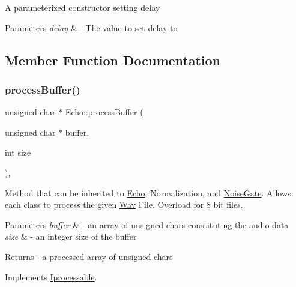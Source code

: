 A parameterized constructor setting delay 
\begin{DoxyParams}{Parameters}
{\em delay} & -\/ The value to set delay to \\
\hline
\end{DoxyParams}


\subsection{Member Function Documentation}
\mbox{\label{classEcho_ad4e1835e48ebf660a529c68beb28e9d0}} 
\subsubsection{\texorpdfstring{process\+Buffer()}{processBuffer()}\hspace{0.1cm}{\footnotesize\ttfamily [1/2]}}
{\footnotesize\ttfamily unsigned char $\ast$ Echo\+::process\+Buffer (\begin{DoxyParamCaption}\item[{unsigned char $\ast$}]{buffer,  }\item[{int}]{size }\end{DoxyParamCaption})\hspace{0.3cm}{\ttfamily [override]}, {\ttfamily [virtual]}}

Method that can be inherited to \hyperlink{classEcho}{Echo}, Normalization, and \hyperlink{classNoiseGate}{Noise\+Gate}. Allows each class to process the given \hyperlink{classWav}{Wav} File. Overload for 8 bit files. 
\begin{DoxyParams}{Parameters}
{\em buffer} & -\/ an array of unsigned chars constituting the audio data \\
\hline
{\em size} & -\/ an integer size of the buffer \\
\hline
\end{DoxyParams}
\begin{DoxyReturn}{Returns}
-\/ a processed array of unsigned chars 
\end{DoxyReturn}


Implements \hyperlink{classIprocessable_a6f0ff631112fba8eb55d9760b41987ea}{Iprocessable}.

\mbox{\label{classEcho_aea3e5f4352454ad3182695044ebefacf}} 
